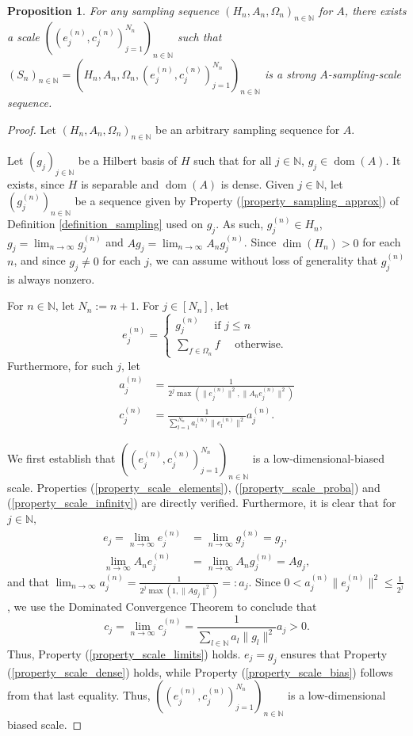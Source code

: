\documentclass[10pt,a4paper]{amsart}
\newtheorem{prop}[thm]{Proposition}
\begin{document}
\begin{prop}\label{proposition_scale_existence}
	For any sampling sequence $(H_n,A_n,\Omega_n)_{n\in\mathbb{N}}$ for $A$, there exists a scale $((e_j^{(n)},c_j^{(n)})_{j=1}^{N_n})_{n\in\mathbb{N}}$ such that $(S_n)_{n\in\mathbb{N}}=(H_n,A_n,\Omega_n,(e_j^{(n)},c_j^{(n)})_{j=1}^{N_n})_{n\in\mathbb{N}}$ is a strong $A$-sampling-scale sequence.
\end{prop}
\begin{proof}
	Let $(H_n,A_n,\Omega_n)_{n\in\mathbb{N}}$ be an arbitrary sampling sequence for $A$.
	
	Let $(g_j)_{j\in\mathbb{N}}$ be a Hilbert basis of $H$ such that for all $j\in\mathbb{N}$, $g_j\in\operatorname{dom}(A)$. It exists, since $H$ is separable and $\operatorname{dom}(A)$ is dense. Given $j\in\mathbb{N}$, let $(g_j^{(n)})_{n\in\mathbb{N}}$ be a sequence given by Property (\ref{property_sampling_approx}) of Definition \ref{definition_sampling} used on $g_j$. As such, $g_j^{(n)}\in H_n$, $g_j=\lim_{n\rightarrow\infty}g_j^{(n)}$ and $Ag_j=\lim_{n\rightarrow\infty}A_ng_j^{(n)}$. Since $\dim(H_n)>0$ for each $n$, and since $g_j\neq 0$ for each $j$, we can assume without loss of generality that $g_j^{(n)}$ is always nonzero. 
	
	For $n\in\mathbb{N}$, let $N_n:=n+1$. For $j\in[N_n]$, let $$e_j^{(n)}=\begin{cases}g_j^{(n)} \quad \text{ if } j\leq n\\\sum_{f\in\Omega_n}f \quad \text{ otherwise. }\end{cases}$$ 
	Furthermore, for such $j$, let 
	\begin{align*}
		a_j^{(n)}&=\frac{1}{2^j\max\left(\|e_j^{(n)}\|^2,\|A_n e_j^{(n)}\|^2\right)}\\
		c_j^{(n)}&=\frac{1}{\sum_{l=1}^{N_n}a_l^{(n)}\|e_l^{(n)}\|^2}a_j^{(n)}.	
	\end{align*}
	
	
	
	We first establish that $((e_j^{(n)},c_j^{(n)})_{j=1}^{N_n})_{n\in\mathbb{N}}$ is a low-dimensional-biased scale. Properties (\ref{property_scale_elements}), (\ref{property_scale_proba}) and (\ref{property_scale_infinity}) are directly verified. Furthermore, it is clear that for $j\in\mathbb{N},$ \begin{align*}e_j=\lim_{n\rightarrow\infty}e_j^{(n)}&=\lim_{n\rightarrow\infty}g_j^{(n)}=g_j,\\ \lim_{n\rightarrow\infty}A_ne_j^{(n)}&=\lim_{n\rightarrow\infty}A_ng_j^{(n)}=Ag_j,
	\end{align*} 
	and that $\lim_{n\rightarrow\infty}a_j^{(n)}=\frac{1}{2^j\max(1,\|Ag_j\|^2)}=:a_j.$ Since $0<a_j^{(n)}\|e_j^{(n)}\|^2\leq\frac{1}{2^j}$, we use the Dominated Convergence Theorem to conclude that $$c_j=\lim_{n\rightarrow\infty}c_j^{(n)}=\frac{1}{\sum_{l\in\mathbb{N}}a_l\|g_l\|^2}a_j>0.$$ Thus, Property (\ref{property_scale_limits}) holds. $e_j=g_j$ ensures that Property (\ref{property_scale_dense}) holds, while Property (\ref{property_scale_bias}) follows from that last equality. Thus, $((e_j^{(n)},c_j^{(n)})_{j=1}^{N_n})_{n\in\mathbb{N}}$ is a low-dimensional biased scale.
	

\end{proof}
\end{document}
